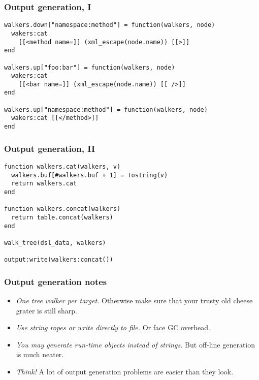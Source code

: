 \documentclass[handout]{beamer}
\begin{document}

\begin{frame}[fragile]

\frametitle{Output generation, I}

\begin{verbatim}
walkers.down["namespace:method"] = function(walkers, node)
  wakers:cat
    [[<method name=]] (xml_escape(node.name)) [[>]]
end

walkers.up["foo:bar"] = function(walkers, node)
  wakers:cat
    [[<bar name=]] (xml_escape(node.name)) [[ />]]
end

walkers.up["namespace:method"] = function(walkers, node)
  wakers:cat [[</method>]]
end
\end{verbatim}

\end{frame}


\begin{frame}[fragile]

\frametitle{Output generation, II}

\begin{verbatim}
function walkers.cat(walkers, v)
  walkers.buf[#walkers.buf + 1] = tostring(v)
  return walkers.cat
end

function walkers.concat(walkers)
  return table.concat(walkers)
end

walk_tree(dsl_data, walkers)

output:write(walkers:concat())
\end{verbatim}

\end{frame}


\begin{frame}

\frametitle{Output generation notes}

\begin{itemize}
\item \emph{One tree walker per target.} Otherwise make sure that your trusty old cheese grater is still sharp.
\pause
\item \emph{Use string ropes or write directly to file.} Or face GC overhead.
\pause
\item \emph{You may generate run-time objects instead of strings.} But off-line generation is much neater.
\pause
\item \emph{Think!} A lot of output generation problems are easier than they look.
\end{itemize}

\end{frame}
\end{document}
